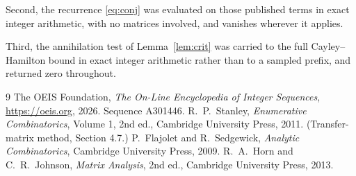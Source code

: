 \documentclass[11pt,a4paper]{article}
\theoremstyle{plain}
\theoremstyle{definition}
\begin{document}
Second, the recurrence \eqref{eq:conj} was evaluated on those published terms in exact
integer arithmetic, with no matrices involved, and vanishes wherever it applies.

Third, the annihilation test of Lemma~\ref{lem:crit} was carried to the full
Cayley--Hamilton bound in exact integer arithmetic rather than to a sampled prefix, and
returned zero throughout.

\begin{thebibliography}{9}
 The OEIS Foundation, \emph{The On-Line Encyclopedia of Integer
Sequences}, \url{https://oeis.org}, 2026. Sequence A301446.
 R.~P.~Stanley, \emph{Enumerative Combinatorics}, Volume 1, 2nd ed.,
Cambridge University Press, 2011. (Transfer-matrix method, Section 4.7.)
 P.~Flajolet and R.~Sedgewick, \emph{Analytic Combinatorics}, Cambridge
University Press, 2009.
 R.~A.~Horn and C.~R.~Johnson, \emph{Matrix Analysis}, 2nd ed., Cambridge
University Press, 2013.
\end{thebibliography}
\end{document}
